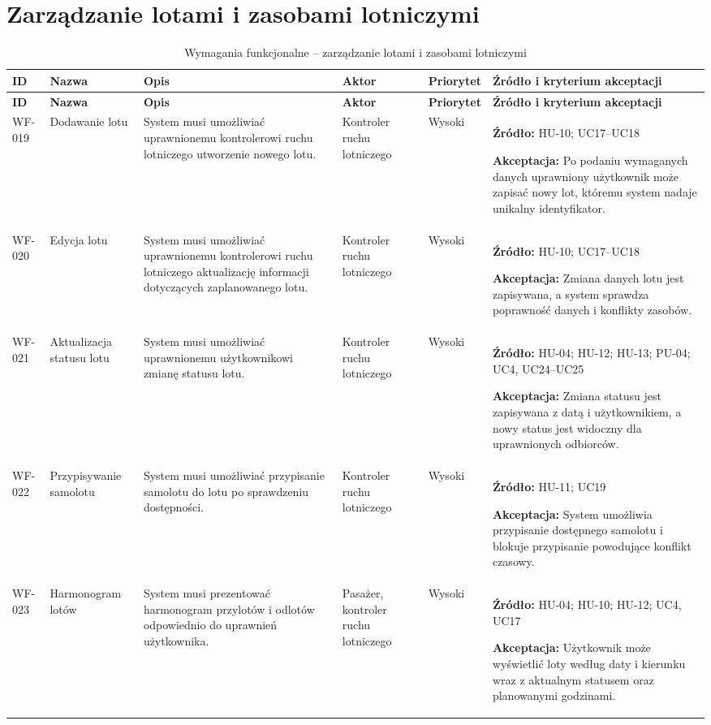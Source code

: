 \documentclass[12pt,a4paper,oneside]{report}
\begin{document}
\section{Zarządzanie lotami i zasobami lotniczymi}
\small
\begin{longtable}{|p{1.05cm}|p{2.15cm}|p{3.35cm}|p{1.75cm}|p{0.95cm}|p{4.05cm}|}
\caption{Wymagania funkcjonalne -- zarządzanie lotami i zasobami lotniczymi}\\\hline
\rowcolor{lightblue}\textbf{ID} & \textbf{Nazwa} & \textbf{Opis} & \textbf{Aktor} & \textbf{Priorytet} & \textbf{Źródło i kryterium akceptacji}\\\hline
\endfirsthead
\hline
\rowcolor{lightblue}\textbf{ID} & \textbf{Nazwa} & \textbf{Opis} & \textbf{Aktor} & \textbf{Priorytet} & \textbf{Źródło i kryterium akceptacji}\\\hline
\endhead
WF-019 & Dodawanie lotu & System musi umożliwiać uprawnionemu kontrolerowi ruchu lotniczego utworzenie nowego lotu. & Kontroler ruchu lotniczego & Wysoki & \textbf{Źródło:} HU-10; UC17–UC18\par\textbf{Akceptacja:} Po podaniu wymaganych danych uprawniony użytkownik może zapisać nowy lot, któremu system nadaje unikalny identyfikator.\\\hline
WF-020 & Edycja lotu & System musi umożliwiać uprawnionemu kontrolerowi ruchu lotniczego aktualizację informacji dotyczących zaplanowanego lotu. & Kontroler ruchu lotniczego & Wysoki & \textbf{Źródło:} HU-10; UC17–UC18\par\textbf{Akceptacja:} Zmiana danych lotu jest zapisywana, a system sprawdza poprawność danych i konflikty zasobów.\\\hline
WF-021 & Aktualizacja statusu lotu & System musi umożliwiać uprawnionemu użytkownikowi zmianę statusu lotu. & Kontroler ruchu lotniczego & Wysoki & \textbf{Źródło:} HU-04; HU-12; HU-13; PU-04; UC4, UC24–UC25\par\textbf{Akceptacja:} Zmiana statusu jest zapisywana z datą i użytkownikiem, a nowy status jest widoczny dla uprawnionych odbiorców.\\\hline
WF-022 & Przypisywanie samolotu & System musi umożliwiać przypisanie samolotu do lotu po sprawdzeniu dostępności. & Kontroler ruchu lotniczego & Wysoki & \textbf{Źródło:} HU-11; UC19\par\textbf{Akceptacja:} System umożliwia przypisanie dostępnego samolotu i blokuje przypisanie powodujące konflikt czasowy.\\\hline
WF-023 & Harmonogram lotów & System musi prezentować harmonogram przylotów i odlotów odpowiednio do uprawnień użytkownika. & Pasażer, kontroler ruchu lotniczego & Wysoki & \textbf{Źródło:} HU-04; HU-10; HU-12; UC4, UC17\par\textbf{Akceptacja:} Użytkownik może wyświetlić loty według daty i kierunku wraz z aktualnym statusem oraz planowanymi godzinami.\\\hline

\end{longtable}
\end{document}
